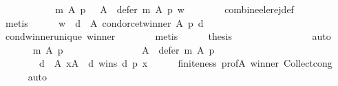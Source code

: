 \begin{isabellebody}
\ \ \ \ \isamarkupfalse%
\ {}\ {}\ {}\ \isamarkupfalse%
\ {}{\isacharcolon}{\kern0pt}\ {\isachardoublequoteopen}m\ A\ p\ {\isacharequal}{\kern0pt}\ {\isacharparenleft}{\kern0pt}{\isacharbraceleft}{\kern0pt}{\isacharbraceright}{\kern0pt}{\isacharcomma}{\kern0pt}\ A\ {\isacharminus}{\kern0pt}\ defer\ m\ A\ p{\isacharcomma}{\kern0pt}\ {\isacharbraceleft}{\kern0pt}w{\isacharbraceright}{\kern0pt}{\isacharparenright}{\kern0pt}{\isachardoublequoteclose}\isanewline
\ \ \ \ \ \ \isamarkupfalse%
\ combine{\isacharunderscore}{\kern0pt}ele{\isacharunderscore}{\kern0pt}rej{\isacharunderscore}{\kern0pt}def\isanewline
\ \ \ \ \ \ \isamarkupfalse%
\ metis\isanewline
\ \ \ \ \isamarkupfalse%
\ {\isachardoublequoteopen}{\isacharbraceleft}{\kern0pt}w{\isacharbraceright}{\kern0pt}\ {\isacharequal}{\kern0pt}\ {\isacharbraceleft}{\kern0pt}d\ {\isasymin}\ A{\isachardot}{\kern0pt}\ condorcet{\isacharunderscore}{\kern0pt}winner\ A\ p\ d{\isacharbraceright}{\kern0pt}{\isachardoublequoteclose}\isanewline
\ \ \ \ \ \ \isamarkupfalse%
\ cond{\isacharunderscore}{\kern0pt}winner{\isacharunderscore}{\kern0pt}unique{}\ winner\isanewline
\ \ \ \ \ \ \isamarkupfalse%
\ metis\isanewline
\ \ \ \ \isamarkupfalse%
\ {\isacharquery}{\kern0pt}thesis\isanewline
\ \ \ \ \ \ \isamarkupfalse%
\ {\isachardoublequoteopen}{}{\isachardoublequoteclose}\isanewline
\ \ \ \ \ \ \isamarkupfalse%
\ auto\isanewline
\ \ \isamarkupfalse%
\isanewline
\ \ \isamarkupfalse%
\isanewline
\ \ \ \ {\isachardoublequoteopen}m\ A\ p\ {\isacharequal}{\kern0pt}\isanewline
\ \ \ \ \ \ {\isacharparenleft}{\kern0pt}{\isacharbraceleft}{\kern0pt}{\isacharbraceright}{\kern0pt}{\isacharcomma}{\kern0pt}\isanewline
\ \ \ \ \ \ \ \ A\ {\isacharminus}{\kern0pt}\ defer\ m\ A\ p{\isacharcomma}{\kern0pt}\isanewline
\ \ \ \ \ \ \ \ {\isacharbraceleft}{\kern0pt}d\ {\isasymin}\ A{\isachardot}{\kern0pt}\ {\isasymforall}x{\isasymin}A\ {\isacharminus}{\kern0pt}\ {\isacharbraceleft}{\kern0pt}d{\isacharbraceright}{\kern0pt}{\isachardot}{\kern0pt}\ wins\ d\ p\ x{\isacharbraceright}{\kern0pt}{\isacharparenright}{\kern0pt}{\isachardoublequoteclose}\isanewline
\ \ \ \ \isamarkupfalse%
\ finiteness\ prof{\isacharunderscore}{\kern0pt}A\ winner\ Collect{\isacharunderscore}{\kern0pt}cong\isanewline
\ \ \ \ \isamarkupfalse%
\ auto\isanewline
\ \ \isamarkupfalse%

\end{isabellebody}
